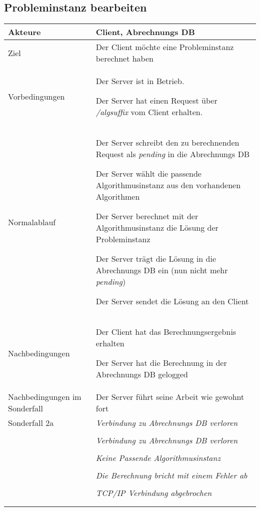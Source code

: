 \documentclass[a4paper,10pt,titlepage]{article}
\makeatletter
\newcommand\novspace{\@minipagetrue}
\newenvironment{owncompactitem}{%
\compactitem
}{%
\@finalstrut\@arstrutbox
\@nameuse{endcompactitem}%
\aftergroup\let\aftergroup\@finalstrut\aftergroup\@gobble
}
\newenvironment{owncompactenum}{%
\compactenum
}{%
\@finalstrut\@arstrutbox
\@nameuse{endcompactenum}%
\aftergroup\let\aftergroup\@finalstrut\aftergroup\@gobble
}
\newcommand{\usecase}[7]
{\subsection{#1}
\setlength{\extrarowheight}{2pt}
\begin{tabular}{|p{0.2\textwidth}|p{0.9\textwidth}|}
\hline
  Akteure & #2\\\hline
  Ziel & #3\\\hline
  Vorbedingungen & \novspace
  	\begin{owncompactitem}[-] #4 \end{owncompactitem} \\\hline
  Normalablauf & \vspace{-7pt}
  	\begin{owncompactenum}[1.] #6 \end{owncompactenum} \\\hline
  Nachbedingungen & \novspace
  	\begin{owncompactitem}[-] #5 \end{owncompactitem} \\\hline
  #7
\end{tabular}
}
\newcommand{\sonderfall}[4][\empty]
{
Sonderfall #2 & \vspace{-10pt}
	\textit{#3}
	\begin{owncompactenum}[{#2}.1] {#4} \end{owncompactenum}
  	\ifthenelse{\equal{#1}{\empty}}
    	{\\\hline} %
    	{\ensuremath{\rightarrow} #1 \\ [+1pt] \hline} %

}
\newcommand{\sondernachbedingung}[1]
{
Nachbedingungen im Sonderfall& \novspace
	\begin{owncompactitem}[-]
		#1
	\end{owncompactitem} \\\hline
}
\makeatother
\begin{document}
\usecase{Probleminstanz bearbeiten}{Client, Abrechnungs DB}%
{Der Client möchte eine Probleminstanz berechnet haben}%
{%
  \item Der Server ist in Betrieb.
  \item Der Server hat einen Request über \textit{/algsuffix} vom Client erhalten.
}
{%
  \item Der Client hat das Berechnungsergebnis erhalten
  \item Der Server hat die Berechnung in der Abrechnungs DB gelogged
}
{%
  \item Der Server schreibt den zu berechnenden Request als \textit{pending} in die Abrechnungs DB
  \item Der Server wählt die passende Algorithmusinstanz aus den vorhandenen Algorithmen
  \item Der Server berechnet mit der Algorithmusinstanz die Lösung der Probleminstanz
  \item Der Server trägt die Lösung in die Abrechnungs DB ein (nun nicht mehr \textit{pending})
  \item Der Server sendet die Lösung an den Client
  }
{%
\sondernachbedingung{
  \item Der Server führt seine Arbeit wie gewohnt fort
}
\sonderfall[Panic]{2a}%
	{Verbindung zu Abrechnungs DB verloren}%
  	{
	\item Der Fehler wird ins Log geschrieben (als schwerwiegender Fehler)
	\item Der Server wird beendet
  	}
\sonderfall[Panic]{4a}%
	{Verbindung zu Abrechnungs DB verloren}%
	{\item \textit{siehe 2a}}
\sonderfall[Weiter mit normalem Betrieb]{2a}%
	{Keine Passende Algorithmusinstanz}%
  	{
	\item Der Fehler wird ins Log geschrieben
	\item Der Client erhält eine entsprechende Fehlermeldung
  	}
\sonderfall[Weiter mit normalem Betrieb]{3a}%
	{Die Berechnung bricht mit einem Fehler ab}%
  	{
	\item Der Fehler wird ins Log geschrieben
	\item Der Request wird in der Abrechnungs DB auf failed gesetzt und der genaue Fehler eingetragen
	\item Der Client erhält eine entsprechende Fehlermeldung
  	}
\sonderfall[Weiter mit normalem Betrieb]{5a}%
	{TCP/IP Verbindung abgebrochen}%
  	{\item Der Fehler wird ins Log geschrieben
  	}
}
\end{document}

